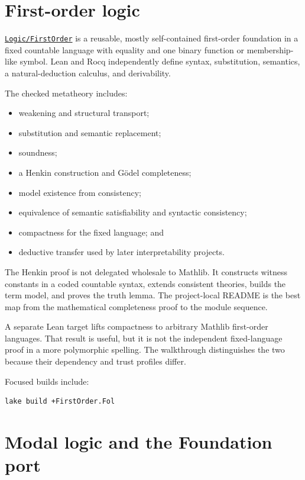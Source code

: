 \documentclass[
  10pt,
  a4paper,
  twoside,
  open=any,
  parskip=half,
  headings=big
]{scrreprt}
\newcommand{\CommitFull}{56a402bf82a9aab119fcbe3e96b991d387b221c5}
\newcommand{\RepoWeb}{https://github.com/VladimirReshetnikov/ProveIt}
\newcommand{\RepoTreeBase}{\RepoWeb/tree/\CommitFull}
\newcommand{\RepoDir}[1]{\href{\RepoTreeBase/#1}{\nolinkurl{#1}}}
\begin{document}
\section{First-order logic}
\label{sec:first-order}

\RepoDir{Logic/FirstOrder} is a reusable, mostly self-contained first-order foundation in a fixed countable language with equality and one binary function or membership-like symbol. Lean and Rocq independently define syntax, substitution, semantics, a natural-deduction calculus, and derivability.

The checked metatheory includes:

\begin{itemize}
  \item weakening and structural transport;
  \item substitution and semantic replacement;
  \item soundness;
  \item a Henkin construction and G\"odel completeness;
  \item model existence from consistency;
  \item equivalence of semantic satisfiability and syntactic consistency;
  \item compactness for the fixed language; and
  \item deductive transfer used by later interpretability projects.
\end{itemize}

The Henkin proof is not delegated wholesale to Mathlib. It constructs witness constants in a coded countable syntax, extends consistent theories, builds the term model, and proves the truth lemma. The project-local README is the best map from the mathematical completeness proof to the module sequence.

A separate Lean target lifts compactness to arbitrary Mathlib first-order languages. That result is useful, but it is not the independent fixed-language proof in a more polymorphic spelling. The walkthrough distinguishes the two because their dependency and trust profiles differ.

Focused builds include:

\begin{lstlisting}[language=bash]
lake build +FirstOrder.Fol
\end{lstlisting}

\section{Modal logic and the Foundation port}
\label{sec:modal-foundation}
\end{document}
